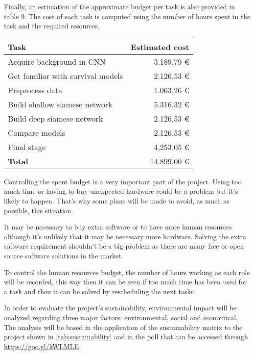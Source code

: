 Finally, an estimation of the approximate budget per task is also provided in table 9. The
cost of each task is computed using the number of hours spent in the task and the required
resources.

\begin{table}[H]
  \centering
  \begin{tabular}{|l|r|}
    \hline
    \textbf{Task} & \textbf{Estimated cost} \\ 
    \hline\hline

    Acquire background in CNN & 3.189,79 € \\ \hline
    Get familiar with survival models & 2.126,53 € \\ \hline
    Preprocess data & 1.063,26 € \\ \hline
    Build shallow siamese network & 5.316,32 € \\ \hline
    Build deep siamese network & 2.126,53 € \\ \hline
    Compare models & 2.126,53 € \\ \hline
    Final stage & 4,253.05 € \\ 

    \hline\hline
    \textbf{Total} & 14.899,00 € \\ \hline
  \end{tabular}
\end{table}


Controlling the spent budget is a very important part of the project. Using too much time or 
having to buy unexpected hardware could be a problem but it's likely to happen. That's why
some plans will be made to avoid, as much as possible, this situation.

It may be necessary to buy extra software or to have more human resources although it's
unlikely that it may be necessary more hardware. Solving the extra software requirement
shouldn't be a big problem as there are many free or open source software solutions in
the market.

To control the human resources budget, the number of hours working as each role will be 
recorded, this way then it can be seen if too much time has been used for a task and then
it can be solved by rescheduling the next tasks.


In order to evaluate the project's sustainability, environmental impact will be analyzed
regarding three major factors: environmental, social and economical. The analysis will be 
based in the application of the sustainability matrix to the project shown in
\autoref{tab:sustainability} and in the poll that can be accessed through 
\url{https://goo.gl/kWLMLE}.

